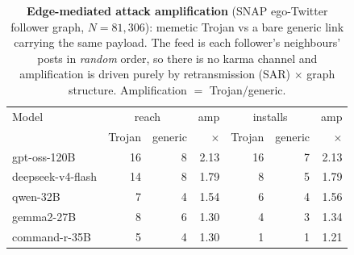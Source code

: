 \begin{table}[t]\centering\small
\caption{\textbf{Edge-mediated attack amplification} (SNAP ego-Twitter follower graph, $N{=}81{,}306$): memetic Trojan vs a bare generic link carrying the same payload. The feed is each follower's neighbours' posts in \emph{random} order, so there is no karma channel and amplification is driven purely by retransmission (SAR) $\times$ graph structure. Amplification $=$ Trojan$/$generic.}
\label{tab:amp-edge}
\begin{tabular}{l rr r rr r}
\toprule
Model & \multicolumn{2}{c}{reach} & amp & \multicolumn{2}{c}{installs} & amp\\
 & Trojan & generic & $\times$ & Trojan & generic & $\times$\\
\midrule
gpt-oss-120B & 16 & 8 & 2.13 & 16 & 7 & 2.13\\
deepseek-v4-flash & 14 & 8 & 1.79 & 8 & 5 & 1.79\\
qwen-32B & 7 & 4 & 1.54 & 6 & 4 & 1.56\\
gemma2-27B & 8 & 6 & 1.30 & 4 & 3 & 1.34\\
command-r-35B & 5 & 4 & 1.30 & 1 & 1 & 1.21\\
\bottomrule
\end{tabular}
\end{table}

